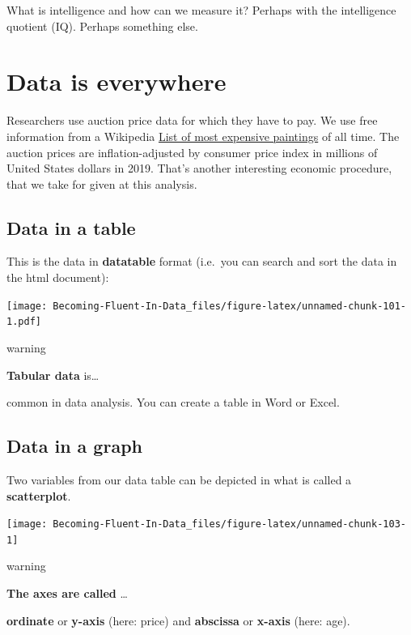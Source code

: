 \documentclass[
]{book}
\begin{document}
What is intelligence and how can we measure it? Perhaps with the intelligence quotient (IQ). Perhaps something else.

\hypertarget{data-is-everywhere-1}{%
\section{Data is everywhere}\label{data-is-everywhere-1}}

Researchers use auction price data for which they have to pay. We use free information from a Wikipedia \href{https://en.wikipedia.org/wiki/List_of_most_expensive_paintings}{List of most expensive paintings} of all time. The auction prices are inflation-adjusted by consumer price index in millions of United States dollars in 2019. That's another interesting economic procedure, that we take for given at this analysis.

\hypertarget{data-in-a-table}{%
\subsection{Data in a table}\label{data-in-a-table}}

This is the data in \textbf{datatable} format (i.e.~you can search and sort the data in the html document):

\texttt{[image: Becoming-Fluent-In-Data\_files/figure-latex/unnamed-chunk-101-1.pdf]}

\begin{infobox}warning

\textbf{Tabular data} is\ldots{}

common in data analysis. You can create a table in Word or Excel.

\end{infobox}

\hypertarget{data-in-a-graph}{%
\subsection{Data in a graph}\label{data-in-a-graph}}

Two variables from our data table can be depicted in what is called a \textbf{scatterplot}.

\begin{center}\texttt{[image: Becoming-Fluent-In-Data\_files/figure-latex/unnamed-chunk-103-1]} \end{center}

\begin{infobox}warning

\textbf{The axes are called} \ldots{}

\textbf{ordinate} or \textbf{y-axis} (here: price) and \textbf{abscissa} or \textbf{x-axis} (here: age).

\end{infobox}
\end{document}
